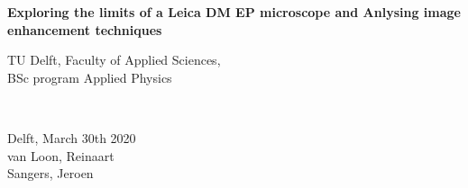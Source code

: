 \begin{titlepage}

\newcommand{\HRule}{\rule{\linewidth}{0.5mm}} %

\center


{ \huge \bfseries Exploring the limits of a Leica DM EP microscope and Anlysing image enhancement techniques}\\[1cm] %






\vfill
\begin{minipage}{0.4\textwidth}
    \begin{flushleft}
        TU Delft, Faculty of Applied Sciences,\\
        BSc program Applied Physics
    \end{flushleft}
\end{minipage}
~
\begin{minipage}{0.4\textwidth}
    \begin{flushright}
        Delft, March 30th 2020\\
        van Loon, Reinaart\\
        Sangers, Jeroen
    \end{flushright}
\end{minipage}\\[1.5cm]


\end{titlepage}
